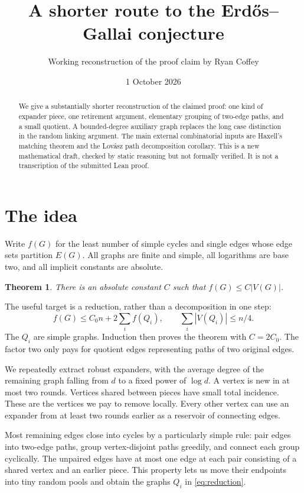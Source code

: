 \documentclass[11pt]{article}
\title{A shorter route to the Erd\H{o}s--Gallai conjecture}
\author{Working reconstruction of the proof claim by Ryan Coffey}
\date{1 October 2026}
\newtheorem{theorem}{Theorem}
\theoremstyle{remark}\newtheorem*{remark}{Remark}
\begin{document}
\maketitle
\begin{abstract}
We give a substantially shorter reconstruction of the claimed proof: one
kind of expander piece, one retirement argument, elementary grouping of
two-edge paths, and a small quotient. A bounded-degree auxiliary graph
replaces the long case distinction in the random linking argument.
The main external combinatorial inputs are Haxell's matching theorem
and the Lov\'asz path decomposition corollary.
This is a new mathematical draft, checked by static reasoning but not
formally verified. It is not a transcription of the submitted Lean proof.
\end{abstract}

\section{The idea}
Write $f(G)$ for the least number of simple cycles and single edges whose
edge sets partition $E(G)$. All graphs are finite and simple, all logarithms
are base two, and all implicit constants are absolute.

\begin{theorem}\label{thm:main}
There is an absolute constant $C$ such that $f(G)\le C|V(G)|$.
\end{theorem}

The useful target is a reduction, rather than a decomposition in one step:
\begin{equation}\label{eq:reduction}
 f(G)\le C_0 n+2\sum_i f(Q_i),\qquad
 \sum_i|V(Q_i)|\le n/4.
\end{equation}
The $Q_i$ are simple graphs. Induction then proves the theorem with
$C=2C_0$. The factor two only pays for quotient edges representing paths
of two original edges.

We repeatedly extract robust expanders, with the average degree of the
remaining graph falling from $d$ to a fixed power of $\log d$. A vertex
is new in at most two rounds. Vertices shared between pieces have small
total incidence. These are the vertices we pay to remove locally.
Every other vertex can use an expander from at least two rounds earlier
as a reservoir of connecting edges.

Most remaining edges close into cycles by a particularly simple rule:
pair edges into two-edge paths, group vertex-disjoint paths greedily,
and connect each group cyclically. The unpaired edges have at most one
edge at each pair consisting of a shared vertex and an earlier piece.
This property lets us move their endpoints into tiny random pools and
obtain the graphs $Q_i$ in \eqref{eq:reduction}.
\end{document}

